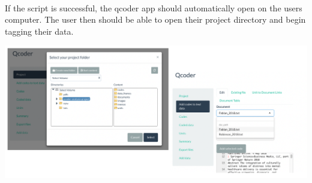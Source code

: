\documentclass[unknownkeysallowed,usepdftitle=false, parskip=full]{beamer}
\newcommand{\secvariable}{nothing}
\newcommand{\mysection}[1]{\renewcommand{\secvariable}{#1}
}
\begin{document}
\begin{frame}\label{slabtable}
\begin{columns}
\begin{column}[t]{1.1\textwidth}
\hyperlink{slab}{}\\

If the script is successful, the qcoder app should automatically open on the users computer. The user then should be able to open their project directory and begin tagging their data. 

\includegraphics[width=1\textwidth,height=0.7\textheight,keepaspectratio]{qcoder.png}



\vspace{0.3cm}
\end{column}
\end{columns}



\end{frame}




\mysection{minor}
\end{document}
